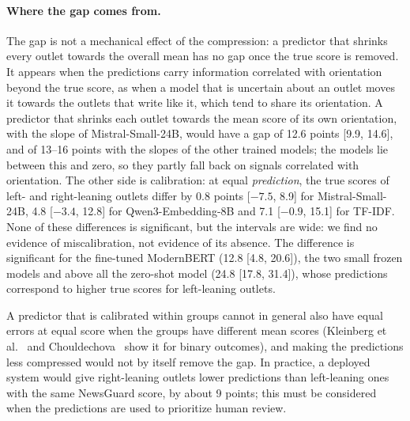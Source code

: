 \documentclass[11pt,a4paper]{article}
\begin{document}
\paragraph{Where the gap comes from.}
The gap is not a mechanical effect of the compression: a predictor that shrinks every outlet towards the overall mean
has no gap once the true score is removed. It appears when the predictions carry information correlated with orientation
beyond the true score, as when a model that is uncertain about an outlet moves it towards the outlets that write like it,
which tend to share its orientation. A predictor that shrinks each outlet towards the mean score of its own orientation,
with the slope of Mistral-Small-24B, would have a gap of 12.6 points [9.9, 14.6], and of 13--16 points with the slopes
of the other trained models; the models lie between this and zero, so they partly fall back on signals correlated with
orientation. The other side is calibration: at equal \emph{prediction}, the true scores of left- and right-leaning
outlets differ by 0.8 points [$-7.5$, 8.9] for Mistral-Small-24B, 4.8 [$-3.4$, 12.8] for Qwen3-Embedding-8B and 7.1
[$-0.9$, 15.1] for TF-IDF. None of these differences is significant, but the intervals are wide: we find no evidence of
miscalibration, not evidence of its absence. The difference is significant for the fine-tuned ModernBERT (12.8 [4.8,
20.6]), the two small frozen models and above all the zero-shot model (24.8 [17.8, 31.4]), whose predictions correspond
to higher true scores for left-leaning outlets.

A predictor that is calibrated within groups cannot in general also have equal errors at equal score when the groups
have different mean scores (Kleinberg et al.~\cite{kleinberg2017inherent} and Chouldechova~\cite{chouldechova2017fair}
show it for binary outcomes), and making the predictions less compressed would not by itself remove the gap. In practice,
a deployed system would give right-leaning outlets lower predictions than left-leaning ones with the same NewsGuard score,
by about 9 points; this must be considered when the predictions are used to prioritize human review.

\end{document}
